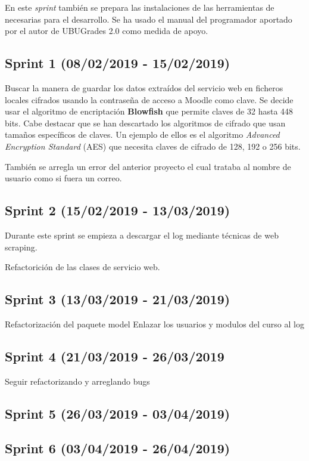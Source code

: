 En este \textit{sprint} también se prepara las instalaciones de las herramientas de necesarias para el desarrollo. Se ha usado el manual del programador aportado por el autor de  UBUGrades 2.0 \cite{} como medida de apoyo.


\subsection{Sprint 1 (08/02/2019 - 15/02/2019)}

Buscar la manera de guardar los datos extraídos del servicio web en ficheros locales cifrados usando la contraseña de acceso a Moodle como clave. Se decide usar el algoritmo de encriptación \textbf{Blowfish} \cite{} que permite claves de 32 hasta 448 bits. Cabe destacar que se han descartado los algoritmos de cifrado que usan tamaños específicos de claves. Un ejemplo de ellos es el algoritmo \textit{Advanced Encryption Standard} (AES) \cite{} que necesita claves de cifrado de 128, 192 o 256 bits.

También se arregla un error del anterior proyecto el cual trataba al nombre de usuario como si fuera un correo.

\subsection{Sprint 2 (15/02/2019 - 13/03/2019)}

Durante este sprint se empieza a descargar el log mediante técnicas de web scraping.

Refactorición de las clases de servicio web.


\subsection{Sprint 3 (13/03/2019 - 21/03/2019)}
Refactorización del paquete model
Enlazar los usuarios y modulos del curso al log

\subsection{Sprint 4 (21/03/2019 - 26/03/2019}
Seguir refactorizando y arreglando bugs

\subsection{Sprint 5 (26/03/2019 - 03/04/2019)}

\subsection{Sprint 6 (03/04/2019 - 26/04/2019)}

